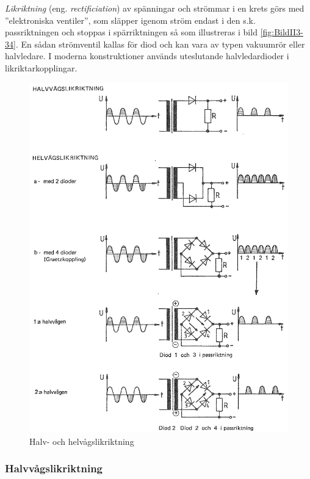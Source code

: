 \emph{Likriktning} (eng. \emph{rectificiation}) av spänningar och strömmar i en
krets görs med ''elektroniska ventiler'', som släpper igenom ström endast i den
s.k. passriktningen och stoppas i spärriktningen så som illustreras i bild
\ref{fig:BildII3-34}.
En sådan strömventil kallas för diod och kan vara av typen vakuumrör eller
halvledare.
I moderna konstruktioner används uteslutande halvledardioder i
likriktarkopplingar.

\begin{figure}
\includegraphics[width=\textwidth]{images/cropped_pdfs/bild_2_3-35.pdf}
\caption{Halv- och helvågslikriktning}
\label{fig:BildII3-35}
\end{figure}

\subsubsection{Halvvågslikriktning}

